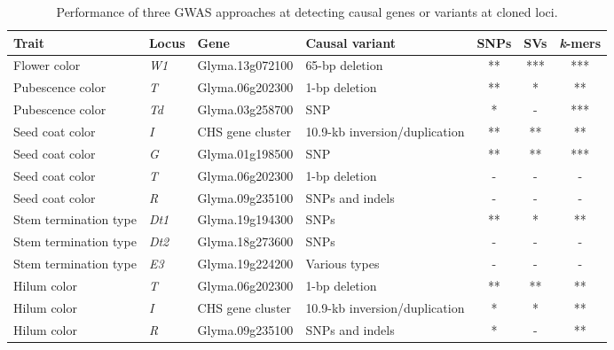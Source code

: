 \documentclass{article}
\begin{document}
\begin{landscape}
\begin{table}[p]
	\caption[Performance of three GWAS approaches at detecting causal genes/variants]%
	{Performance of three GWAS approaches at detecting causal genes or variants at cloned loci.}
	\label{loci-table}

	\footnotesize
	\centering
	\begin{threeparttable}
		\begin{tabular}{llllccc}
		\toprule Trait & Locus & Gene & Causal variant & SNPs\tnote{a} & SVs\tnote{b} & \textit{k}-mers \\ \midrule
		Flower color & \textit{W1} & Glyma.13g072100 & 65-bp deletion \citep{zabala2007} & ** & *** & *** \\
		Pubescence color & \textit{T} & Glyma.06g202300 & 1-bp deletion \citep{zabala2003} & ** & * & ** \\
		Pubescence color & \textit{Td} & Glyma.03g258700 & SNP \citep{yan2020} & * & - & *** \\
		Seed coat color & \textit{I} & CHS gene cluster & 10.9-kb inversion/duplication \citep{tuteja2008} & ** & ** & ** \\
		Seed coat color & \textit{G} & Glyma.01g198500 & SNP \citep{wang2018} & ** & ** & *** \\
		Seed coat color\tnote{c} & \textit{T} & Glyma.06g202300 & 1-bp deletion \citep{zabala2003} & - & - & - \\
		Seed coat color\tnote{c} & \textit{R} & Glyma.09g235100 & SNPs and indels \citep{gillman2011} & - & - & - \\
		Stem termination type & \textit{Dt1} & Glyma.19g194300 & SNPs \citep{liu2010} & ** & * & ** \\
		Stem termination type\tnote{c} & \textit{Dt2} & Glyma.18g273600 & SNPs \citep{ping2014} & - & - & - \\
		Stem termination type\tnote{c} & \textit{E3} & Glyma.19g224200 & Various types \citep{tardivel2019} & - & - & - \\
		Hilum color\tnote{c} & \textit{T} & Glyma.06g202300 & 1-bp deletion \citep{zabala2003} & ** & ** & ** \\
		Hilum color\tnote{c} & \textit{I} & CHS gene cluster & 10.9-kb inversion/duplication \citep{tuteja2008} & * & * & ** \\
		Hilum color & \textit{R} & Glyma.09g235100 & SNPs and indels \citep{gillman2011} & * & - & ** \\

\end{tabular}
\end{threeparttable}
\end{table}
\end{landscape}
\end{document}
